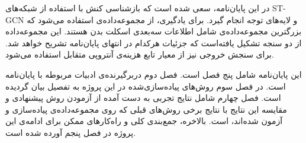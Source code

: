 
در این پایان‌نامه، سعی شده است که بازشناسی کنش با استفاده از شبکه‌های ST-GCN و لایه‌های توجه انجام گیرد. برای یادگیری، از مجموعه‌داده‌ی \cite{NTU_paper} استفاده می‌شود که بزرگترین مجموعه‌داده‌ی شامل اطلاعات سه‌بعدی اسکلت بدن هستند. این مجموعه‌داده از دو سنجه تشکیل یافته‌است که جزئیات هرکدام در انتهای پایان‌نامه تشریح خواهد شد. برای سنجش خروجی نیز از معیار تابع هزینه‌ی آنتروپی متقابل استفاده می‌شود. 


این پایان‌نامه شامل پنج فصل است. 
فصل دوم دربرگیرنده‌ی ادبیات مربوطه با پایان‌نامه است. 
در فصل سوم روش‌های پیاده‌سازی‌شده در این پروژه به تفصیل بیان گردیده است. فصل چهارم شامل نتایج تجربی به دست آمده از آزمودن روش پیشنهادی و مقایسه این نتایج با نتایج برخی روش‌های قبلی که روی مجموعه‌داده‌ی  پیاده‌سازی و آزمون شده‌اند، است. بالاخره، جمع‌بندی کلی و راه‌کارهای‌ ممکن برای ادامه‌ی این پروژه در فصل پنجم آورده شده است.

